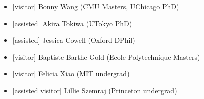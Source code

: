 \begin{itemize}
\item {[}visitor{]} Bonny Wang (CMU Masters, UChicago PhD)
\item {[}assisted{]} Akira Tokiwa (UTokyo PhD)
\item {[}assisted{]} Jessica Cowell (Oxford DPhil)
\item {[}visitor{]} Baptiste Barthe-Gold (Ecole Polytechnique Masters)
\item {[}visitor{]} Felicia Xiao (MIT undergrad)
\item {[}assisted visitor{]} Lillie Szemraj (Princeton undergrad)
\end{itemize}
